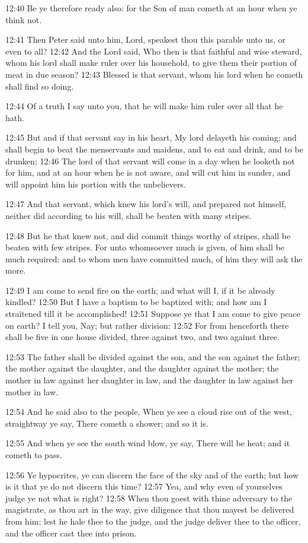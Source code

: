 12:40 Be ye therefore ready also: for the Son of man cometh at an hour
when ye think not.

12:41 Then Peter said unto him, Lord, speakest thou this parable unto
us, or even to all?  12:42 And the Lord said, Who then is that
faithful and wise steward, whom his lord shall make ruler over his
household, to give them their portion of meat in due season?  12:43
Blessed is that servant, whom his lord when he cometh shall find so
doing.

12:44 Of a truth I say unto you, that he will make him ruler over all
that he hath.

12:45 But and if that servant say in his heart, My lord delayeth his
coming; and shall begin to beat the menservants and maidens, and to
eat and drink, and to be drunken; 12:46 The lord of that servant will
come in a day when he looketh not for him, and at an hour when he is
not aware, and will cut him in sunder, and will appoint him his
portion with the unbelievers.

12:47 And that servant, which knew his lord's will, and prepared not
himself, neither did according to his will, shall be beaten with many
stripes.

12:48 But he that knew not, and did commit things worthy of stripes,
shall be beaten with few stripes. For unto whomsoever much is given,
of him shall be much required: and to whom men have committed much, of
him they will ask the more.

12:49 I am come to send fire on the earth; and what will I, if it be
already kindled?  12:50 But I have a baptism to be baptized with; and
how am I straitened till it be accomplished!  12:51 Suppose ye that I
am come to give peace on earth? I tell you, Nay; but rather division:
12:52 For from henceforth there shall be five in one house divided,
three against two, and two against three.

12:53 The father shall be divided against the son, and the son against
the father; the mother against the daughter, and the daughter against
the mother; the mother in law against her daughter in law, and the
daughter in law against her mother in law.

12:54 And he said also to the people, When ye see a cloud rise out of
the west, straightway ye say, There cometh a shower; and so it is.

12:55 And when ye see the south wind blow, ye say, There will be heat;
and it cometh to pass.

12:56 Ye hypocrites, ye can discern the face of the sky and of the
earth; but how is it that ye do not discern this time?  12:57 Yea, and
why even of yourselves judge ye not what is right?  12:58 When thou
goest with thine adversary to the magistrate, as thou art in the way,
give diligence that thou mayest be delivered from him; lest he hale
thee to the judge, and the judge deliver thee to the officer, and the
officer cast thee into prison.

